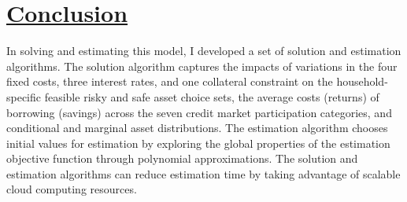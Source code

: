\documentclass[12pt,english]{article}
\begin{document}
\section{\href{https://papers.ssrn.com/sol3/papers.cfm?abstract_id=3316939}{Conclusion}}

In solving and estimating this model, I developed a set of solution and estimation algorithms. The solution algorithm captures the impacts of variations in the four fixed costs, three interest rates, and one collateral constraint on the household-specific feasible risky and safe asset choice sets, the average costs (returns) of borrowing (savings) across the seven credit market participation categories, and conditional and marginal asset distributions. The estimation algorithm chooses initial values for estimation by exploring the global properties of the estimation objective function through polynomial approximations. The solution and estimation algorithms can reduce estimation time by taking advantage of scalable cloud computing resources.


\pagebreak
\begingroup
{}
\setlength\bibitemsep{0pt}
\printbibliography
\endgroup
\pagebreak
\end{document}

